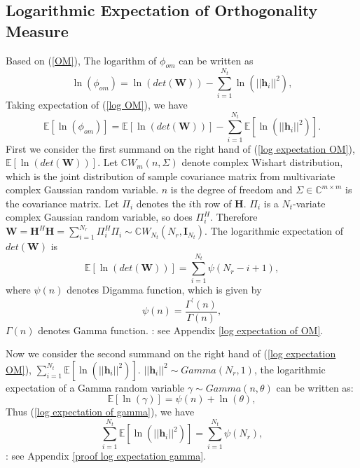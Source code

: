 \documentclass[12pt, draftclsnofoot, onecolumn]{IEEEtran}
\begin{document}
\subsection{Logarithmic Expectation of Orthogonality Measure}
Based on (\ref{OM}), The logarithm of $\phi_{om}$ can be written as 
\begin{equation}
\ln(\phi_{om})=\ln(det(\mathbf{W}))-\sum_{i=1}^{N_{t}}\ln(||\mathbf{h}_{i}||^{2}),
\label{log OM}
\end{equation}
Taking expectation of (\ref{log OM}), we have 
\begin{equation}
\mathbb{E}[\ln(\phi_{om})]=\mathbb{E}[\ln(det(\mathbf{W}))]-\sum_{i=1}^{N_{t}}\mathbb{E}[\ln(||\mathbf{h}_{i}||^{2})].
\label{log expectation OM}
\end{equation}
First we consider the first summand on the right hand of (\ref{log expectation OM}), $\mathbb{E}[\ln(det(\mathbf{W}))]$. Let $\mathbb{C}W_{m}(n, \Sigma)$ denote complex Wishart distribution, which is the joint distribution of sample covariance matrix from multivariate complex Gaussian random variable\cite{goodman1963statistical}. $n$ is the degree of freedom and $\Sigma\in \mathbb{C}^{m\times m}$ is the covariance matrix. Let $\Pi_{i}$ denotes the $i$th row of $\mathbf{H}$. $\Pi_{i}$ is a $N_{t}$-variate complex Gaussian random variable, so does $\Pi_{i}^{H}$. Therefore $\mathbf{W}=\mathbf{H}^{H}\mathbf{H}=\sum_{i=1}^{N_{r}}\Pi_{i}^{H}\Pi_{i}\sim \mathbb{C}W_{N_{t}}(N_{r}, \mathbf{I}_{N_{t}})$. The logarithmic expectation of $det(\mathbf{W})$ is
\begin{equation}
\mathbb{E}[\ln(det(\mathbf{W}))]=\sum_{i=1}^{N_{t}}\psi(N_{r}-i+1),
\label{log expectation of wishart}
\end{equation}
where $\psi(n)$ denotes Digamma function, which is given by\cite{papoulis2002probability}
\begin{equation}
\psi(n)=\frac{\Gamma^{'}(n)}{\Gamma(n)},
\label{Digmma function}
\end{equation}
$\Gamma(n)$ denotes Gamma function\cite{papoulis2002probability}.
\proof: see Appendix \ref{log expectation of OM}.

Now we consider the second summand on the right hand of (\ref{log expectation OM}), $\sum_{i=1}^{N_{t}}\mathbb{E}[\ln(||\mathbf{h}_{i}||^{2})]$. $||\mathbf{h}_{i}||^{2}\sim Gamma(N_{r}, 1)$, the logarithmic expectation of a Gamma random variable $\gamma\sim Gamma(n, \theta)$ can be written as:
\begin{equation}
\mathbb{E}[\ln(\gamma)]=\psi(n)+\ln(\theta),
\label{log expectation of gamma}
\end{equation}
Thus (\ref{log expectation of gamma}), we have
\begin{equation}
\sum_{i=1}^{N_{t}}\mathbb{E}[\ln(||\mathbf{h}_{i}||^{2})]=\sum_{i=1}^{N_{t}}\psi(N_{r}),
\label{sum of log expectation gamma}
\end{equation}
\proof: see Appendix \ref{proof log expectation gamma}.
\end{document}
